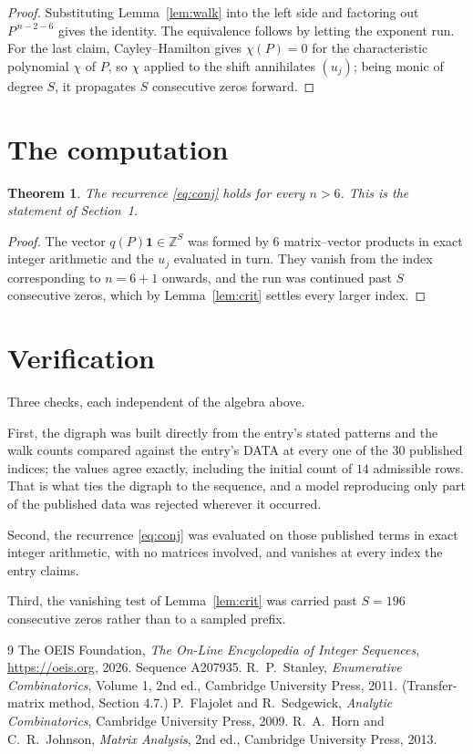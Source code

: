 \documentclass[11pt,a4paper]{article}
\theoremstyle{plain}
\newtheorem{theorem}{Theorem}
\theoremstyle{definition}
\begin{document}
\begin{proof}
Substituting Lemma~\ref{lem:walk} into the left side and factoring out
$P^{\,n-2-6}$ gives the identity. The equivalence follows by letting the exponent
run. For the last claim, Cayley--Hamilton gives $\chi(P)=0$ for the characteristic
polynomial $\chi$ of $P$, so $\chi$ applied to the shift annihilates $(u_j)$; being monic of
degree $S$, it propagates $S$ consecutive zeros forward.
\end{proof}

\section{The computation}

\begin{theorem}
The recurrence \eqref{eq:conj} holds for every $n>6$. This is the statement of
Section~1.
\end{theorem}

\begin{proof}
The vector $q(P)\mathbf{1}\in\mathbb{Z}^{S}$ was formed by $6$ matrix--vector
products in exact integer arithmetic and the $u_j$ evaluated in turn. They vanish from the
index corresponding to $n=6+1$ onwards, and the run was continued past $S$ consecutive
zeros, which by Lemma~\ref{lem:crit} settles every larger index.
\end{proof}

\section{Verification}

Three checks, each independent of the algebra above.

First, the digraph was built directly from the entry's stated patterns and the walk counts
compared against the entry's DATA at every one of the $30$ published indices; the
values agree exactly, including the initial count of $14$ admissible rows. That is
what ties the digraph to the sequence, and a model reproducing only part of the published
data was rejected wherever it occurred.

Second, the recurrence \eqref{eq:conj} was evaluated on those published terms in exact
integer arithmetic, with no matrices involved, and vanishes at every index the entry claims.

Third, the vanishing test of Lemma~\ref{lem:crit} was carried past $S=196$ consecutive
zeros rather than to a sampled prefix.

\begin{thebibliography}{9}
 The OEIS Foundation, \emph{The On-Line Encyclopedia of Integer
Sequences}, \url{https://oeis.org}, 2026. Sequence A207935.
 R.~P.~Stanley, \emph{Enumerative Combinatorics}, Volume 1, 2nd ed.,
Cambridge University Press, 2011. (Transfer-matrix method, Section 4.7.)
 P.~Flajolet and R.~Sedgewick, \emph{Analytic Combinatorics}, Cambridge
University Press, 2009.
 R.~A.~Horn and C.~R.~Johnson, \emph{Matrix Analysis}, 2nd ed., Cambridge
University Press, 2013.
\end{thebibliography}
\end{document}
